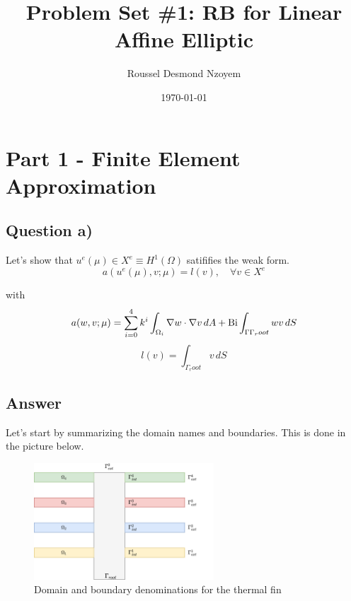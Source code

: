 \documentclass[
	english,
	11pt, %
]{fphw}
\title{Problem Set \#1: RB for Linear Affine Elliptic} %
\author{Roussel Desmond Nzoyem} %
\date{\today} %
\institute{University of Strasbourg \\ UFR de Mathématiques et Informatique} %
\newcommand{\bi}{\text{Bi}}
\begin{document}
\maketitle %



\section{Part 1 - Finite Element Approximation}

\subsection*{Question a)}
\begin{problem}
	Let's show that $u^e(\mu) \in X^e \equiv H^1(\Omega)$ satififies the weak form.
	\begin{equation}
		\tag{7}\label{eq:7}
		a(u^e(\mu),v;\mu)=l(v), \quad \forall v \in X^e 
	\end{equation}

	with
	$$
		a(w,v;\mu) = \sum_{i=0}^{4} k^i \int_{\Omega_i} \nabla w \cdot \nabla v \, dA + \bi \int_{\Gamma \\ \Gamma_root} w v \, dS
	$$
	$$
		l(v) = \int_{\Gamma_root} v \, dS
	$$
\end{problem}


\subsection*{Answer} 


\indent Let's start by summarizing the domain names and boundaries. This is done in the picture below.

\begin{figure}[h]
	\centering
	\includegraphics[width=0.6\textwidth]{ThermalFin.png}
	\captionsetup{justification=centering}
	\caption{Domain and boundary denominations for the thermal fin}
\end{figure}
\end{document}
